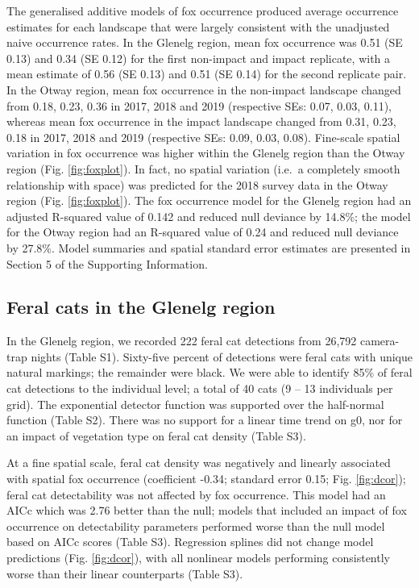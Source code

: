 \documentclass[]{elsarticle} %
\begin{document}
The generalised additive models of fox occurrence produced average occurrence estimates for each landscape that were largely consistent with the unadjusted naive occurrence rates. In the Glenelg region, mean fox occurrence was 0.51 (SE 0.13) and 0.34 (SE 0.12) for the first non-impact and impact replicate, with a mean estimate of 0.56 (SE 0.13) and 0.51 (SE 0.14) for the second replicate pair. In the Otway region, mean fox occurrence in the non-impact landscape changed from 0.18, 0.23, 0.36 in 2017, 2018 and 2019 (respective SEs: 0.07, 0.03, 0.11), whereas mean fox occurrence in the impact landscape changed from 0.31, 0.23, 0.18 in 2017, 2018 and 2019 (respective SEs: 0.09, 0.03, 0.08). Fine-scale spatial variation in fox occurrence was higher within the Glenelg region than the Otway region (Fig. \ref{fig:foxplot}). In fact, no spatial variation (i.e.~a completely smooth relationship with space) was predicted for the 2018 survey data in the Otway region (Fig. \ref{fig:foxplot}). The fox occurrence model for the Glenelg region had an adjusted R-squared value of 0.142 and reduced null deviance by 14.8\%; the model for the Otway region had an R-squared value of 0.24 and reduced null deviance by 27.8\%. Model summaries and spatial standard error estimates are presented in Section 5 of the Supporting Information.

\hypertarget{feral-cats-in-the-glenelg-region}{%
\subsection{Feral cats in the Glenelg region}\label{feral-cats-in-the-glenelg-region}}

In the Glenelg region, we recorded 222 feral cat detections from 26,792 camera-trap nights (Table S1). Sixty-five percent of detections were feral cats with unique natural markings; the remainder were black. We were able to identify 85\% of feral cat detections to the individual level; a total of 40 cats (9 -- 13 individuals per grid). The exponential detector function was supported over the half-normal function (Table S2). There was no support for a linear time trend on g0, nor for an impact of vegetation type on feral cat density (Table S3).

At a fine spatial scale, feral cat density was negatively and linearly associated with spatial fox occurrence (coefficient -0.34; standard error 0.15; Fig. \ref{fig:dcor}); feral cat detectability was not affected by fox occurrence. This model had an AICc which was 2.76 better than the null; models that included an impact of fox occurrence on detectability parameters performed worse than the null model based on AICc scores (Table S3). Regression splines did not change model predictions (Fig. \ref{fig:dcor}), with all nonlinear models performing consistently worse than their linear counterparts (Table S3).
\end{document}
